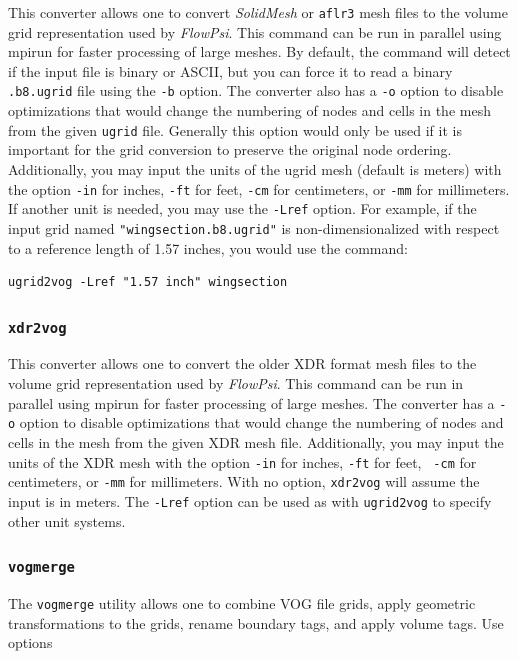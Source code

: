 \documentclass{article}
\begin{document}
This converter allows one to convert {\it SolidMesh} or {\tt aflr3}
mesh files to the volume grid representation used by {\em FlowPsi}.  This
command can be run in parallel using mpirun for faster processing of
large meshes.  By default, the command will detect if the input file is
binary or ASCII, but you can force it to read a binary {\tt .b8.ugrid}
file using the {\tt -b} option.  The converter also has a {\tt -o}
option to disable optimizations that would change the numbering of
nodes and cells in the mesh from the given {\tt ugrid} file.
Generally this option would only be used if it is important for the
grid conversion to preserve the original node ordering.  Additionally,
you may input the units of the ugrid mesh (default is meters) with the option {\tt -in}
for inches, {\tt -ft} for feet, {\tt -cm} for centimeters, or {\tt -mm} for millimeters.  If another
unit is needed, you may use the {\tt -Lref} option. For example, if the
input grid named {\tt "wingsection.b8.ugrid"} is
non-dimensionalized with respect to a reference length
of 1.57 inches, you would use the command:
\begin{verbatim}
ugrid2vog -Lref "1.57 inch" wingsection
\end{verbatim}

\subsubsection{\tt xdr2vog}

This converter allows one to convert the older XDR format mesh files
to the volume grid representation used by {\em FlowPsi}.  This command can be
run in parallel using mpirun for faster processing of large meshes.
The converter has a {\tt -o} option to disable optimizations that
would change the numbering of nodes and cells in the mesh from the
given XDR mesh file.  Additionally, you may input the units of the XDR
mesh with the option {\tt -in} for inches, {\tt -ft} for feet, {\tt
  -cm} for centimeters, or {\tt -mm} for millimeters.  With no option,
{\tt xdr2vog} will assume the input is in meters.  The {\tt -Lref}
option can be used as with {\tt ugrid2vog} to specify other unit
systems.  

\subsubsection{\tt vogmerge}

The {\tt vogmerge} utility allows one to combine VOG file grids, apply
geometric transformations to the grids, rename boundary tags, and
apply volume tags.  Use options 
\end{document}
